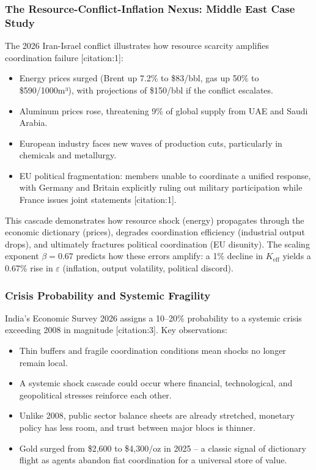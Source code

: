 \documentclass[11pt,a4paper]{article}
\theoremstyle{remark}
\begin{document}
	\subsubsection{The Resource-Conflict-Inflation Nexus: Middle East Case Study}
	The 2026 Iran-Israel conflict illustrates how resource scarcity amplifies coordination failure [citation:1]:
	\begin{itemize}
		\item Energy prices surged (Brent up 7.2\% to \$83/bbl, gas up 50\% to \$590/1000m³), with projections of \$150/bbl if the conflict escalates.
		\item Aluminum prices rose, threatening 9\% of global supply from UAE and Saudi Arabia.
		\item European industry faces new waves of production cuts, particularly in chemicals and metallurgy.
		\item EU political fragmentation: members unable to coordinate a unified response, with Germany and Britain explicitly ruling out military participation while France issues joint statements [citation:1].
	\end{itemize}
	
	This cascade demonstrates how resource shock (energy) propagates through the economic dictionary (prices), degrades coordination efficiency (industrial output drops), and ultimately fractures political coordination (EU disunity). The scaling exponent \(\beta = 0.67\) predicts how these errors amplify: a 1\% decline in \(K_{\text{eff}}\) yields a 0.67\% rise in \(\varepsilon\) (inflation, output volatility, political discord).
	
	\subsubsection{Crisis Probability and Systemic Fragility}
	India's Economic Survey 2026 assigns a 10–20\% probability to a systemic crisis exceeding 2008 in magnitude [citation:3]. Key observations:
	\begin{itemize}
		\item Thin buffers and fragile coordination conditions mean shocks no longer remain local.
		\item A systemic shock cascade could occur where financial, technological, and geopolitical stresses reinforce each other.
		\item Unlike 2008, public sector balance sheets are already stretched, monetary policy has less room, and trust between major blocs is thinner.
		\item Gold surged from \$2,600 to \$4,300/oz in 2025 – a classic signal of dictionary flight as agents abandon fiat coordination for a universal store of value.
	\end{itemize}
	
\end{document}
